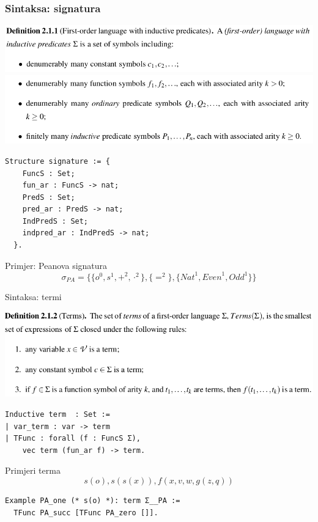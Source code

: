 \documentclass{beamer}
\begin{document}
\begin{frame}[fragile]
  \frametitle{Sintaksa: signatura}
  \begin{center}
    \includegraphics[width=0.6\linewidth]{signatura1}
    \includegraphics[width=0.6\linewidth]{signatura2}
  \end{center}
  \begin{scriptsize}
\begin{verbatim}
Structure signature := {
    FuncS : Set;
    fun_ar : FuncS -> nat;
    PredS : Set;
    pred_ar : PredS -> nat;
    IndPredS : Set;
    indpred_ar : IndPredS -> nat;
  }.
\end{verbatim}
  \end{scriptsize}
  \begin{block}{Primjer: Peanova signatura}
      \[
    \sigma_{\mathit{PA}} = \{ \{ o^{0}, s^{1}, +^{2}, \cdot^{2} \},
    \{=^{2}\}, \{\mathit{Nat}^{1}, \mathit{Even}^{1}, \mathit{Odd}^{1}\}\}
  \]
  \end{block}
\end{frame}

\begin{frame}{Sintaksa: termi}
  \begin{center}
    \includegraphics[width=0.6\linewidth]{term}
  \end{center}
  \begin{footnotesize}
\begin{verbatim}
Inductive term  : Set :=
| var_term : var -> term 
| TFunc : forall (f : FuncS Σ),
    vec term (fun_ar f) -> term.
\end{verbatim}
  \end{footnotesize}
  \begin{block}{Primjeri terma}
    \[
      s(o), s(s(x)), f(x, v, w, g(z, q))
    \]
  \end{block}
  \begin{footnotesize}
\begin{verbatim}
Example PA_one (* s(o) *): term Σ__PA :=
  TFunc PA_succ [TFunc PA_zero []].
\end{verbatim}
  \end{footnotesize}
\end{frame}
\end{document}
